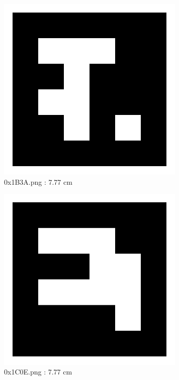 \documentclass[11pt,a4,BCOR=0cm]{scrartcl}
\begin{document}
\begin{figure}
  \centering
    \includegraphics[natwidth=400,natheight=400,width=9cm]{0x1B3A.png}
    \caption{0x1B3A.png : 7.77 cm}
    \label{fig:0x1B3A.png}
  
\end{figure} 

\begin{figure}
  \centering
    \includegraphics[natwidth=400,natheight=400,width=9cm]{0x1C0E.png}
    \caption{0x1C0E.png : 7.77 cm}
    \label{fig:0x1C0E.png}
  
\end{figure} 

\clearpage
\end{document}
